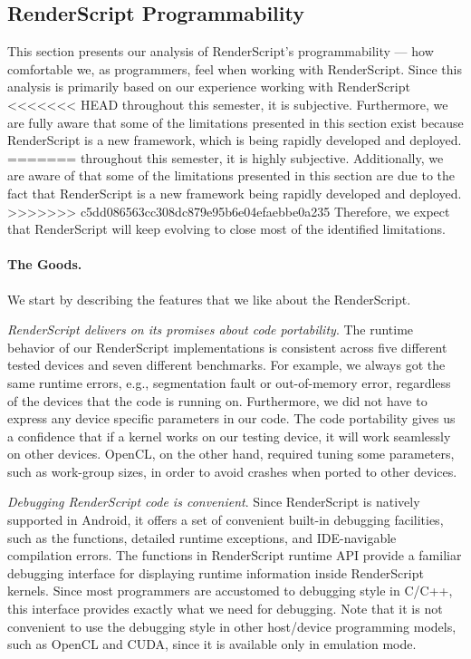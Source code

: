 \subsection{RenderScript Programmability}
This section presents our analysis of RenderScript's programmability --- how
comfortable we, as programmers, feel when working with RenderScript. Since this
analysis is primarily based on our experience working with RenderScript
<<<<<<< HEAD
throughout this semester, it is subjective. Furthermore, we are fully aware
that some of the limitations presented in this section exist because
RenderScript is a new framework, which is being rapidly developed and deployed.
=======
throughout this semester, it is highly subjective. Additionally, we are aware of
that some of the limitations presented in this section are due to the fact that
RenderScript is a new framework being rapidly developed and deployed.
>>>>>>> c5dd086563cc308dc879e95b6e04efaebbe0a235
Therefore, we expect that RenderScript will keep evolving to close most of the
identified limitations.

\paragraph{The Goods.}
We start by describing the features that we like about the RenderScript.

\textit{RenderScript delivers on its promises about code portability}.
The runtime behavior of our RenderScript implementations is consistent across
five different tested devices and seven different benchmarks. For example, we
always got the same runtime errors, e.g., segmentation fault or out-of-memory
error, regardless of the devices that the code is running on. Furthermore, we
did not have to express any device specific parameters in our code. The code
portability gives us a confidence that if a kernel works on our testing device,
it will work seamlessly on other devices. OpenCL, on the other hand, required
tuning some
parameters, such as work-group sizes, in order to avoid crashes when ported to
other devices.

\textit{Debugging RenderScript code is convenient}. Since RenderScript is
natively supported in Android, it offers a set of convenient built-in debugging
facilities, such as the  functions, detailed runtime exceptions,
and IDE-navigable compilation errors. The  functions in
RenderScript runtime API provide a familiar debugging interface for displaying
runtime information inside RenderScript kernels. Since most programmers are accustomed
to  debugging style in C/C++, this interface provides exactly
what we need for debugging. Note that it is not convenient to use the
 debugging style in other host/device programming models, such as
OpenCL and CUDA, since it is available only in emulation mode.

